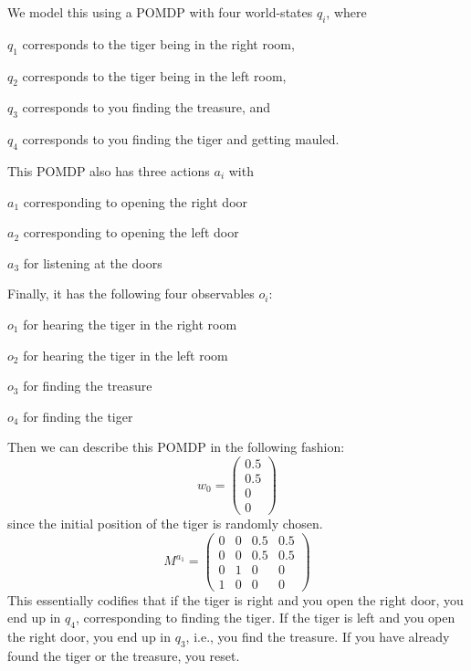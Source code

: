 \documentclass{article}
\theoremstyle{definition}
\begin{document}
We model this using a POMDP with four world-states $q_i$, where 
\begin{compactitem}
\item {$q_1$} corresponds to the tiger being in the right room,
\item {$q_2$} corresponds to the tiger being in the left room, 
\item {$q_3$} corresponds to you finding the treasure, and
\item  {$q_4$} corresponds to you finding the tiger and getting mauled.
\end{compactitem}
This POMDP also has three actions $a_i$ with 
\begin{compactitem}
	\item $a_1$ corresponding to opening the right door
	\item $a_2$ corresponding to opening the left door
	\item $a_3$ for listening at the doors 
\end{compactitem}
Finally, it has the following four observables $o_i$:
\begin{compactitem}
	\item $o_1$ for hearing the tiger in the right room
	\item $o_2$ for hearing the tiger in the left room
	\item $o_3$ for finding the treasure
	\item $o_4$ for finding the tiger
\end{compactitem}
Then we can describe this POMDP in the following fashion:
\[
w_0=\left ( \begin{matrix} 0.5 \\ 0.5 \\ 0 \\ 0 \end{matrix} \right )
\]
since the initial position of the tiger is randomly chosen. 
\[
M^{a_1}=\left ( \begin{matrix}
0 & 0 & 0.5 & 0.5 \\ 
0 & 0 & 0.5 & 0.5 \\
0 & 1 & 0 & 0 \\
1 & 0 & 0 & 0
\end{matrix}
\right )
\]
This essentially codifies that if the tiger is right and you open the right door, you end up in $q_4$, corresponding to finding the tiger. If the tiger is left and you open the right door, you end up in $q_3$, i.e., you find the treasure. If you have already found the tiger or the treasure, you reset. 
\end{document}
